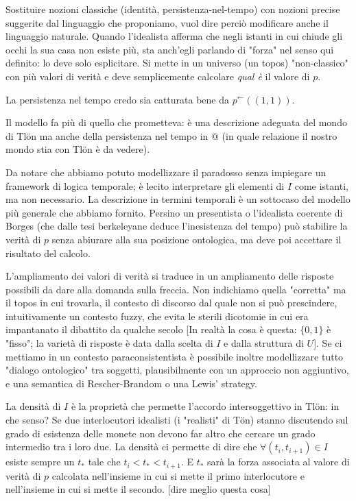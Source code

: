 \documentclass[a4paper, 11pt]{article}
\begin{document}
Sostituire nozioni classiche (identità, persistenza-nel-tempo) con nozioni precise suggerite dal linguaggio che proponiamo, vuol dire perciò modificare anche il linguaggio naturale. Quando l'idealista afferma che negli istanti in cui chiude gli occhi la sua casa non esiste più, sta anch'egli parlando di "forza" nel senso qui definito: lo deve solo esplicitare. Si mette in un universo (un topos) "non-classico" con più valori di verità e deve semplicemente calcolare \emph{qual è} il valore di $p$. 

La persistenza nel tempo credo sia catturata bene da $p^{\leftarrow} ((1,1))$.

Il modello fa più di quello che prometteva: è una descrizione adeguata del mondo di Tl\"on ma anche della persistenza nel tempo in $@$ (in quale relazione il nostro mondo stia con Tl\"on è da vedere). 

Da notare che abbiamo potuto modellizzare il paradosso senza impiegare un framework di logica temporale; è lecito interpretare gli elementi di $I$ come istanti, ma non necessario. La descrizione in termini temporali è un sottocaso del modello più generale che abbiamo fornito. Persino un presentista o l'idealista coerente di Borges (che dalle tesi berkeleyane deduce l'inesistenza del tempo) può stabilire la verità di $p$ senza abiurare alla sua posizione ontologica, ma deve poi accettare il risultato del calcolo. 

L'ampliamento dei valori di verità si traduce in un ampliamento delle risposte possibili da dare alla domanda sulla freccia. Non indichiamo quella "corretta" ma il topos in cui trovarla, il contesto di discorso dal quale non si può prescindere, intuitivamente un contesto fuzzy, che evita le sterili dicotomie in cui era impantanato il dibattito da qualche secolo [In realtà la cosa è questa: $\{0,1\}$ è "fisso"; la varietà di risposte è data dalla scelta di $I$ e dalla struttura di $U$].  Se ci mettiamo in un contesto paraconsistentista è possibile inoltre modellizzare tutto "dialogo ontologico" tra soggetti, plausibilmente con un approccio non aggiuntivo, e una semantica di Rescher-Brandom o una Lewis' strategy. 

La densità di $I$ è la proprietà che permette l'accordo intersoggettivo in Tl\"on: in che senso? Se due interlocutori idealisti (i "realisti" di T\"on) stanno discutendo sul grado di esistenza delle monete non devono far altro che cercare un grado intermedio tra i loro due. La densità ci permette di dire che $\forall (t_i,t_{i+1}) \in I$ esiste sempre un $t_*$ tale che $t_i < t_* < t_{i+1}$. E $t_*$ sarà la forza associata al valore di verità di $p$ calcolata nell'insieme in cui si mette il primo interlocutore e nell'insieme in cui si mette il secondo. [dire meglio questa cosa] 
\end{document}
